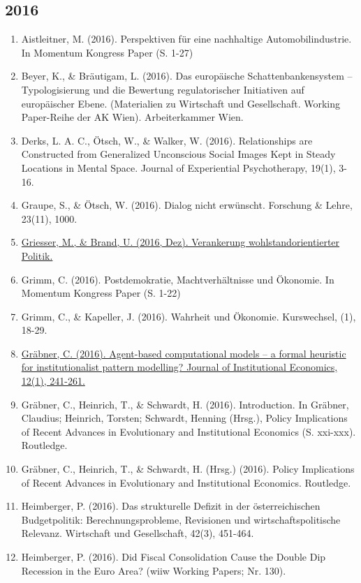 \subsection*{2016}
\begin{enumerate}
	 \item Aistleitner, M. (2016). Perspektiven für eine nachhaltige Automobilindustrie. In Momentum Kongress Paper (S. 1-27)
	 \item Beyer, K., \& Bräutigam, L. (2016). Das europäische Schattenbankensystem – Typologisierung und die Bewertung regulatorischer Initiativen auf europäischer Ebene. (Materialien zu Wirtschaft und Gesellschaft. Working Paper-Reihe der AK Wien). Arbeiterkammer Wien.
	 \item Derks, L. A. C., Ötsch, W., \& Walker, W. (2016). Relationships are Constructed from Generalized Unconscious Social Images Kept in Steady Locations in Mental Space. Journal of Experiential Psychotherapy, 19(1), 3-16.
	 \item Graupe, S., \& Ötsch, W. (2016). Dialog nicht erwünscht. Forschung \& Lehre, 23(11), 1000.
	 \item \href{https://doi.org/10.13140/RG.2.2.18515.37925}{Griesser, M., \& Brand, U. (2016, Dez). Verankerung wohlstandorientierter Politik.}
	 \item Grimm, C. (2016). Postdemokratie, Machtverhältnisse und Ökonomie. In Momentum Kongress Paper (S. 1-22)
	 \item Grimm, C., \& Kapeller, J. (2016). Wahrheit und Ökonomie. Kurswechsel, (1), 18-29.
	 \item \href{https://doi.org/10.1017/S1744137415000193}{Gräbner, C. (2016). Agent-based computational models -- a formal heuristic for institutionalist pattern modelling? Journal of Institutional Economics, 12(1), 241-261.}
	 \item Gräbner, C., Heinrich, T., \& Schwardt, H. (2016). Introduction. In Gräbner, Claudius; Heinrich, Torsten; Schwardt, Henning (Hrsg.), Policy Implications of Recent Advances in Evolutionary and Institutional Economics (S. xxi-xxx). Routledge.
	 \item Gräbner, C., Heinrich, T., \& Schwardt, H. (Hrsg.) (2016). Policy Implications of Recent Advances in Evolutionary and Institutional Economics. Routledge.
	 \item Heimberger, P. (2016). Das \glqq strukturelle Defizit\grqq{} in der österreichischen Budgetpolitik: Berechnungsprobleme, Revisionen und wirtschaftspolitische Relevanz. Wirtschaft und Gesellschaft, 42(3), 451-464.
	 \item Heimberger, P. (2016). Did Fiscal Consolidation Cause the Double Dip Recession in the Euro Area? (wiiw Working Papers; Nr. 130).

\end{enumerate}
